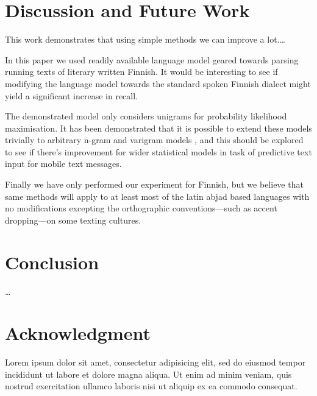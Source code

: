 \documentclass[a4paper,conference]{IEEEtran}
\begin{document}
\section{Discussion and Future Work}
\label{sec:discussion}

This work demonstrates that using simple methods we can improve a lot.\ldots

In this paper we used readily available language model geared towards parsing
running texts of literary written Finnish. It would be interesting to see if
modifying the language model towards the standard spoken Finnish dialect
might yield a significant increase in recall.

The demonstrated model only considers unigrams for probability
likelihood maximisation. It has been demonstrated that it is possible
to extend these models trivially to arbitrary n-gram and varigram
models \cite{Silfverberg/2011}, and this should be explored to see if
there's improvement for wider statistical models in task of predictive
text input for mobile text messages.

Finally we have only performed our experiment for Finnish, but we believe that
same methods will apply to at least most of the latin abjad based languages
with no modifications excepting the orthographic conventions---such as accent
dropping---on some texting cultures.

\section{Conclusion}
\label{sec:conclusions}

\ldots \balance
\section*{Acknowledgment}
Lorem ipsum dolor sit amet, consectetur adipisicing elit, sed do eiusmod tempor incididunt ut labore et dolore magna aliqua. Ut enim ad minim veniam, quis nostrud exercitation ullamco laboris nisi ut aliquip ex ea commodo consequat.

\






\end{document}
